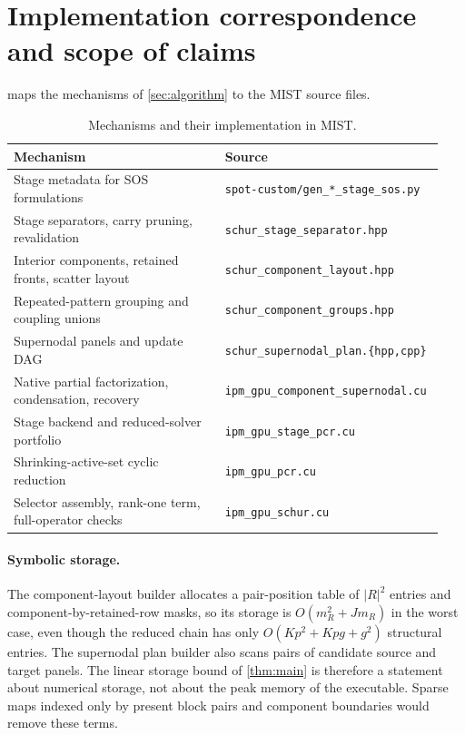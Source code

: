 \section{Implementation correspondence and scope of claims}\label{app:implementation}

 maps the mechanisms of \cref{sec:algorithm} to the MIST source
files. 

\begin{table}[htbp]
\centering
\caption{Mechanisms and their implementation in MIST.}
\label{tab:source}
\small
\begin{tabular}{@{}p{0.48\linewidth}p{0.46\linewidth}@{}}
\toprule
Mechanism & Source\\
\midrule
Stage metadata for SOS formulations & \texttt{spot-custom/gen\_*\_stage\_sos.py}\\
Stage separators, carry pruning, revalidation & \texttt{schur\_stage\_separator.hpp}\\
Interior components, retained fronts, scatter layout & \texttt{schur\_component\_layout.hpp}\\
Repeated-pattern grouping and coupling unions & \texttt{schur\_component\_groups.hpp}\\
Supernodal panels and update DAG & \texttt{schur\_supernodal\_plan.\{hpp,cpp\}}\\
Native partial factorization, condensation, recovery & \texttt{ipm\_gpu\_component\_supernodal.cu}\\
Stage backend and reduced-solver portfolio & \texttt{ipm\_gpu\_stage\_pcr.cu}\\
Shrinking-active-set cyclic reduction & \texttt{ipm\_gpu\_pcr.cu}\\
Selector assembly, rank-one term, full-operator checks & \texttt{ipm\_gpu\_schur.cu}\\
\bottomrule
\end{tabular}
\end{table}

\paragraph{Symbolic storage.}
The component-layout builder allocates a pair-position table of
$|R|^2$ entries and component-by-retained-row masks, so its storage is
$O(m_R^2+Jm_R)$ in the worst case, even though the reduced chain has only
$O(Kp^2+Kpg+g^2)$ structural entries. The supernodal plan builder also scans
pairs of candidate source and target panels. The linear storage bound of
\cref{thm:main} is therefore a statement about numerical storage, not about the
peak memory of the executable. Sparse maps indexed only by present block pairs
and component boundaries would remove these terms.

